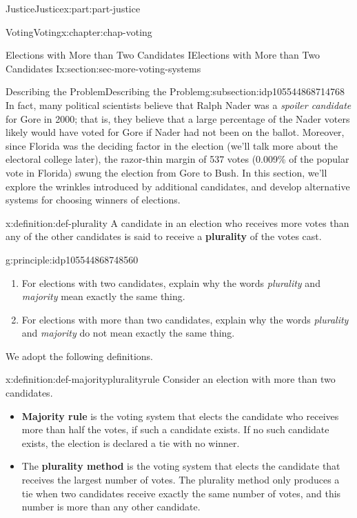 \documentclass[oneside,10pt,]{book}
\newcommand{\terminology}[1]{\textbf{#1}}
\numberwithin{equation}{section}
\begin{document}
\begin{partptx}{Justice}{}{Justice}{}{}{x:part:part-justice}
\begin{chapterptx}{Voting}{}{Voting}{}{}{x:chapter:chap-voting}
\begin{sectionptx}{Elections with More than Two Candidates I}{}{Elections with More than Two Candidates I}{}{}{x:section:sec-more-voting-systems}
\begin{subsectionptx}{Describing the Problem}{}{Describing the Problem}{}{}{g:subsection:idp105544868714768}
 In fact, many political scientists believe that Ralph Nader was a \emph{spoiler candidate} for Gore in 2000; that is, they believe that a large percentage of the Nader voters likely would have voted for Gore if Nader had not been on the ballot. Moreover, since Florida was the deciding factor in the election (we'll talk more about the electoral college later), the razor-thin margin of 537 votes (0.009\% of the popular vote in Florida) swung the election from Gore to Bush. In this section, we'll explore the wrinkles introduced by additional candidates, and develop alternative systems for choosing winners of elections.%
\begin{definition}{}{x:definition:def-plurality}%
%
A candidate in an election who receives more votes than any of the other candidates is said to receive a \terminology{plurality} of the votes cast.%
\end{definition}
\begin{principle}{}{}{g:principle:idp105544868748560}%
%
\begin{enumerate}
\item{}For elections with two candidates, explain why the words \emph{plurality} and \emph{majority} mean exactly the same thing.%
\item{}For elections with more than two candidates, explain why the words \emph{plurality} and \emph{majority} do not mean exactly the same thing.%
\end{enumerate}
\end{principle}
We adopt the following definitions.%
\begin{definition}{}{x:definition:def-majoritypluralityrule}%
%
%
%
Consider an election with more than two candidates.%
%
\begin{itemize}[label=\textbullet]
\item{}\terminology{Majority rule} is the voting system that elects the candidate who receives more than half the votes, if such a candidate exists. If no such candidate exists, the election is declared a tie with no winner.%
\item{}The \terminology{plurality method} is the voting system that elects the candidate that receives the largest number of votes. The plurality method only produces a tie when two candidates receive exactly the same number of votes, and this number is more than any other candidate.%
\end{itemize}

\end{definition}
\end{subsectionptx}
\end{sectionptx}
\end{chapterptx}
\end{partptx}
\end{document}
